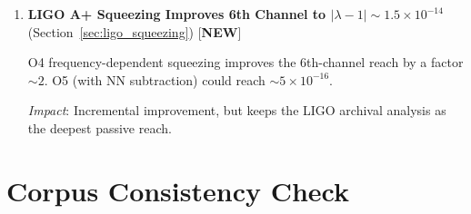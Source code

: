 \documentclass[11pt]{article}
\newcommand{\lam}{\lambda}
\newcommand{\ee}[1]{\times 10^{#1}}
\newcommand{\lbone}{|\lam - 1|}
\theoremstyle{definition}
\theoremstyle{remark}
\begin{document}
\begin{enumerate}
DFD's zero gravitational decoherence prediction adds a seventh
passive observable. Any observed Penrose-type decoherence in
massive superposition experiments (MAQRO, TEQ) falsifies DFD.

\emph{Impact}: Low-cost addition to the detection programme
(requires no DFD-specific hardware, only awareness of existing
quantum-foundations experiments). Timeline: 2028--2035.

\item \textbf{LIGO A+ Squeezing Improves 6th Channel to
  $\lbone \sim 1.5\ee{-14}$} (Section~\ref{sec:ligo_squeezing})
  [\textbf{NEW}]

O4 frequency-dependent squeezing improves the 6th-channel reach
by a factor $\sim 2$. O5 (with NN subtraction) could reach
$\sim 5\ee{-16}$.

\emph{Impact}: Incremental improvement, but keeps the LIGO
archival analysis as the deepest passive reach.

\end{enumerate}


\section*{Corpus Consistency Check}
\end{document}
